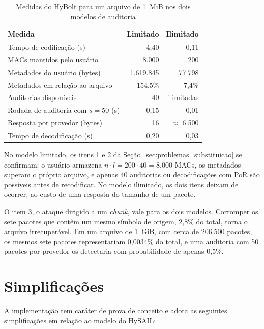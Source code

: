 \begin{table}[h]
	\centering
	\caption{Medidas do HyBolt para um arquivo de 1~MiB nos dois modelos de auditoria}
	\label{tab:problemas_observados}
	\begin{tabular}{lrr}
		\hline
		\textbf{Medida} & \textbf{Limitado} & \textbf{Ilimitado} \\
		\hline
		Tempo de codificação (s) & 4,40 & 0,11 \\
		\acrshort{MAC}s mantidos pelo usuário & 8.000 & 200 \\
		Metadados do usuário (bytes) & 1.619.845 & 77.798 \\
		Metadados em relação ao arquivo & 154,5\% & 7,4\% \\
		Auditorias disponíveis & 40 & ilimitadas \\
		Rodada de auditoria com $s = 50$ (s) & 0,15 & 0,01 \\
		Resposta por provedor (bytes) & 16 & $\approx$ 6.500 \\
		Tempo de decodificação (s) & 0,20 & 0,03 \\
		\hline
	\end{tabular}
\end{table}

No modelo limitado, os itens 1 e 2 da Seção~\ref{sec:problemas_substituicao} se confirmam: o usuário armazena $n \cdot l = 200 \cdot 40 = 8.000$ \acrshort{MAC}s, os metadados superam o próprio arquivo, e apenas 40 auditorias ou decodificações com \acrshort{PoR} são possíveis antes de recodificar. No modelo ilimitado, os dois itens deixam de ocorrer, ao custo de uma resposta do tamanho de um pacote.

O item 3, o ataque dirigido a um \emph{chunk}, vale para os dois modelos. Corromper os sete pacotes que contêm um mesmo símbolo de origem, 2,8\% do total, torna o arquivo irrecuperável. Em um arquivo de 1~GiB, com cerca de 206.500 pacotes, os mesmos sete pacotes representariam 0,0034\% do total, e uma auditoria com 50 pacotes por provedor os detectaria com probabilidade de apenas 0,5\%.

\section{Simplificações}

A implementação tem caráter de prova de conceito e adota as seguintes simplificações em relação ao modelo do HySAIL:

